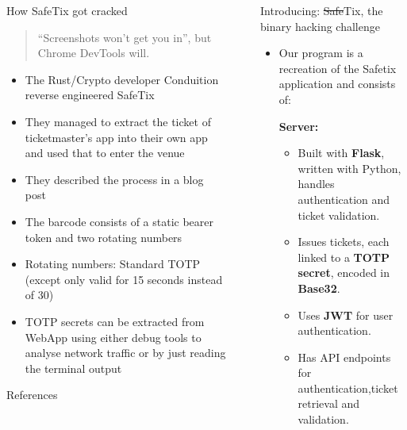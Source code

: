 \documentclass[final,dvipsnames]{beamer}
\newlength{\sepwidth}
\newlength{\colwidth}
\newcommand{\separatorcolumn}{\begin{column}{\sepwidth}\end{column}}
\begin{document}
\begin{frame}[t, fragile]
\begin{columns}[t]
\begin{column}{\colwidth}
    \begin{block}{How SafeTix got cracked}
        \begin{quotation}
            “Screenshots won’t get you in”, but Chrome DevTools will.
        \end{quotation}
        \begin{itemize}
            \item The Rust/Crypto developer Conduition reverse engineered SafeTix \cite{conduition}
            \item They managed to extract the ticket of ticketmaster's app into their own app and used that to enter the venue
            \item They described the process in a blog post \cite{reverse_engineering_ticketmaster}
            \item The barcode consists of a static bearer token and two rotating numbers \cite{reverse_engineering_ticketmaster}
            \item Rotating numbers: Standard TOTP (except only valid for 15 seconds instead of 30)
            \item TOTP secrets can be extracted from WebApp using either debug tools to analyse network traffic or by just reading the terminal output
        \end{itemize}
    \end{block}

    \begin{block}{References}
		\footnotesize{}
	\end{block}

\end{column}

\separatorcolumn

\begin{column}{\colwidth}

    \begin{block}{Introducing: \sout{Safe}Tix, the binary hacking challenge}

		\begin{itemize}
			\item Our program is a recreation of the Safetix application and consists of:
            
            \textbf{Server:}
            \begin{itemize}
                \item Built with \textbf{Flask}, written with Python, handles authentication and ticket validation.
                \item Issues tickets, each linked to a \textbf{TOTP secret}, encoded in \textbf{Base32}.
                \item Uses \textbf{JWT} for user authentication.
                \item Has API endpoints for authentication,ticket retrieval and validation.
            \end{itemize}
        

\end{itemize}
\end{block}
\end{column}
\end{columns}
\end{frame}
\end{document}
